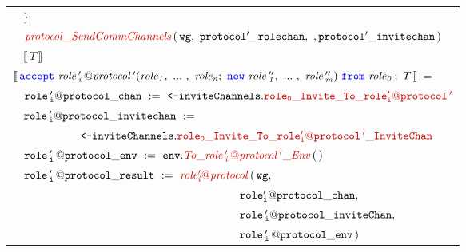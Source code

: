 \documentclass[12pt,twoside]{report}
\begin{document}
\begin{figure}[!h]
\begin{center}
\begin{tabular}{l}
            {\footnotesize
            $\quad \}$}\\[3pt]

            {\footnotesize
            $\quad \functionname{protocol\_SendCommChannels}\,\params{\wg,\ \varname{protocol'\_rolechan},\ ,\varname{protocol'\_invitechan}}$}\\[3pt]
            
            {\footnotesize
            $\quad \llbracket\,T\,\rrbracket$}\\[20pt]

            $\llbracket\,\acceptL{role\,'_i\,@protocol\,'}{role}{role\,''}{role_0}\,;\ T\,\rrbracket$ =\\[6pt]
            
            {\footnotesize
            $\quad \assignment{role\,'_i@protocol\_chan}{\texttt{<-}\structaccess{\invitechannels}{role_0\_Invite\_To\_\localprotocol{role'_i}{protocol\,'}}}$}\\[3pt]

            {\footnotesize
            $\quad {\mathtt{role\,'_i@protocol\_invitechan}}\ :=\ $}\\[3pt]
            
            {\footnotesize
            $\qquad \qquad \qquad\texttt{<-}\structaccess{\invitechannels}{role_0\_Invite\_To\_\localprotocol{role'_i}{protocol\,'}\_InviteChan}$}\\[3pt]

            {\footnotesize
            $\quad \assignment{role\,'_i\,@protocol\_env}{\methodcall{\envparam}{\functionname{To\_\localprotocol{role\,'_i\,}{protocol\,'}\_Env}}\,\emptyparams}$}\\[3pt]

            {\footnotesize
            $\quad \varname{role\,'_i\,@protocol\_result}\ :=\ \functionname{role'_i@protocol}\,(\,\wg,$}\\[3pt]
            
            {\footnotesize
            $\quad \qquad \qquad \qquad \qquad \qquad \qquad \qquad \qquad \qquad \quad \ \varname{role'_i@protocol\_chan},$}\\[3pt]

            {\footnotesize
            $\quad \qquad \qquad \qquad \qquad \qquad \qquad \qquad \qquad \qquad \quad \ \varname{role\,'_i@protocol\_inviteChan},$}\\[3pt]

            {\footnotesize
            $\quad \qquad \qquad \qquad \qquad \qquad \qquad \qquad \qquad \qquad \quad \ \varname{role\,'_i\,@protocol\_env}\,)$}\\[3pt]
            

\end{tabular}
\end{center}
\end{figure}
\end{document}
